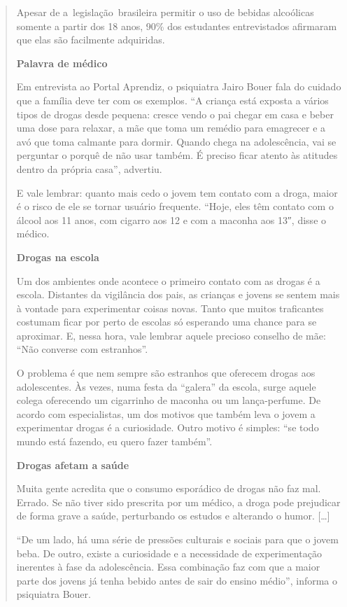 \begin{quote}
Apesar de a~legislação~brasileira permitir o uso de bebidas alcoólicas
somente a partir dos 18 anos, 90\% dos estudantes entrevistados
afirmaram que elas são facilmente adquiridas.

\textbf{Palavra de médico}

Em entrevista ao Portal Aprendiz, o psiquiatra Jairo Bouer fala do
cuidado que a família deve ter com os exemplos. ``A criança está exposta
a vários tipos de drogas desde pequena: cresce vendo o pai chegar em
casa e beber uma dose para relaxar, a mãe que toma um remédio para
emagrecer e a avó que toma calmante para dormir. Quando chega na
adolescência, vai se perguntar o porquê de não usar também. É preciso
ficar atento às atitudes dentro da própria casa'', advertiu.

E vale lembrar: quanto mais cedo o jovem tem contato com a droga, maior
é o risco de ele se tornar usuário frequente. ``Hoje, eles têm contato
com o álcool aos 11 anos, com cigarro aos 12 e com a maconha aos 13″,
disse o médico.

\textbf{Drogas na escola}

Um dos ambientes onde acontece o primeiro contato com as drogas é a
escola. Distantes da vigilância dos pais, as crianças e jovens se sentem
mais à vontade para experimentar coisas novas. Tanto que muitos
traficantes costumam ficar por perto de escolas só esperando uma chance
para se aproximar. E, nessa hora, vale lembrar aquele precioso conselho
de mãe: ``Não converse com estranhos''.

O problema é que nem sempre são estranhos que oferecem drogas aos
adolescentes. Às vezes, numa festa da ``galera'' da escola, surge aquele
colega oferecendo um cigarrinho de maconha ou um lança-perfume. De
acordo com especialistas, um dos motivos que também leva o jovem a
experimentar drogas é a curiosidade. Outro motivo é simples: ``se todo
mundo está fazendo, eu quero fazer também''.

\textbf{Drogas afetam a saúde}

Muita gente acredita que o consumo esporádico de drogas não faz mal.
Errado. Se não tiver sido prescrita por um médico, a droga pode
prejudicar de forma grave a saúde, perturbando os estudos e alterando o
humor. {[}\ldots{}{]}

``De um lado, há uma série de pressões culturais e sociais para que o
jovem beba. De outro, existe a curiosidade e a necessidade de
experimentação inerentes à fase da adolescência. Essa combinação faz com
que a maior parte dos jovens já tenha bebido antes de sair do ensino
médio'', informa o psiquiatra Bouer.


\end{quote}
